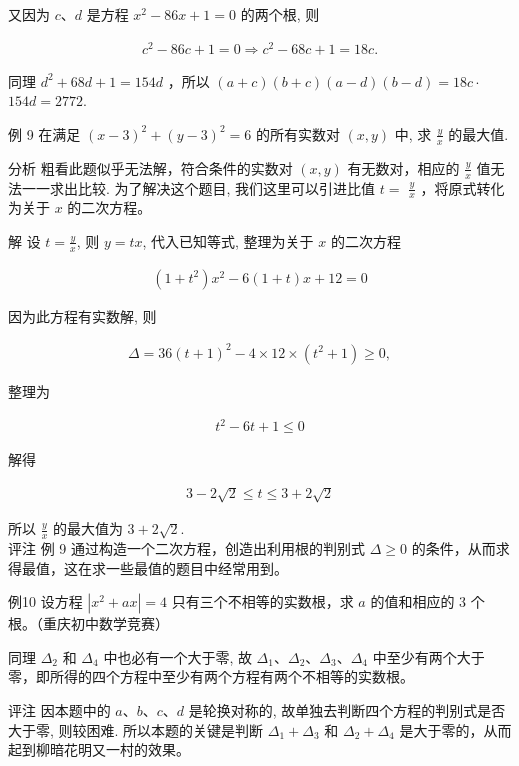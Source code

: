 \documentclass[10pt]{article}
\begin{document}
又因为 $c 、 d$ 是方程 $x^{2}-86 x+1=0$ 的两个根, 则

\begin{align*}
c^{2}-86 c+1=0 \Rightarrow c^{2}-68 c+1=18 c .
\end{align*}

同理 $d^{2}+68 d+1=154 d$ ，所以 $(a+c)(b+c)(a-d)(b-d)=18 c \cdot$ $154 d=2772$.

例 9 在满足 $(x-3)^{2}+(y-3)^{2}=6$ 的所有实数对 $(x, y)$ 中, 求 $\frac{y}{x}$ 的最大值.

分析 粗看此题似乎无法解，符合条件的实数对 $(x, y)$ 有无数对，相应的 $\frac{y}{x}$ 值无法一一求出比较. 为了解决这个题目, 我们这里可以引进比值 $t=$ $\frac{y}{x}$ ，将原式转化为关于 $x$ 的二次方程。

解 设 $t=\frac{y}{x}$, 则 $y=t x$, 代入已知等式, 整理为关于 $x$ 的二次方程

\begin{align*}
\left(1+t^{2}\right) x^{2}-6(1+t) x+12=0
\end{align*}

因为此方程有实数解, 则

\begin{align*}
\Delta=36(t+1)^{2}-4 \times 12 \times\left(t^{2}+1\right) \geqslant 0,
\end{align*}

整理为

\begin{align*}
t^{2}-6 t+1 \leqslant 0
\end{align*}

解得

\begin{align*}
3-2 \sqrt{2} \leqslant t \leqslant 3+2 \sqrt{2}
\end{align*}

所以 $\frac{y}{x}$ 的最大值为 $3+2 \sqrt{2}$.\\
评注 例 9 通过构造一个二次方程，创造出利用根的判别式 $\Delta \geqslant 0$ 的条件，从而求得最值，这在求一些最值的题目中经常用到。

例10 设方程 $\left|x^{2}+a x\right|=4$ 只有三个不相等的实数根，求 $a$ 的值和相应的 3 个根。（重庆初中数学竞赛）

同理 $\Delta_{2}$ 和 $\Delta_{4}$ 中也必有一个大于零, 故 $\Delta_{1} 、 \Delta_{2} 、 \Delta_{3} 、 \Delta_{4}$ 中至少有两个大于零，即所得的四个方程中至少有两个方程有两个不相等的实数根。

评注 因本题中的 $a 、 b 、 c 、 d$ 是轮换对称的, 故单独去判断四个方程的判别式是否大于零, 则较困难. 所以本题的关键是判断 $\Delta_{1}+\Delta_{3}$ 和 $\Delta_{2}+\Delta_{4}$ 是大于零的，从而起到柳暗花明又一村的效果。
\end{document}
